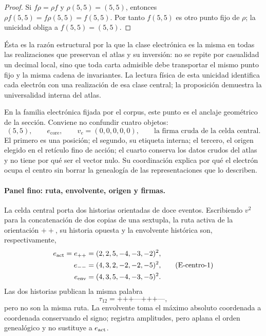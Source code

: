\begin{proof}
Si \(f\rho=\rho f\) y \(\rho(5,5)=(5,5)\), entonces
\(\rho f(5,5)=f\rho(5,5)=f(5,5)\). Por tanto \(f(5,5)\) es otro punto fijo
de \(\rho\); la unicidad obliga a \(f(5,5)=(5,5)\).
\end{proof}

Ésta es la razón estructural por la que la clase electrónica es la misma en
todas las realizaciones que preservan el atlas y su inversión: no se repite
por casualidad un decimal local, sino que toda carta admisible debe
transportar el mismo punto fijo y la misma cadena de invariantes. La lectura
física de esta unicidad identifica cada electrón con una realización de esa
clase central; la proposición demuestra la universalidad interna del atlas.

En la familia electrónica fijada por el corpus, este punto es el anclaje
geométrico de la sección. Conviene no confundir cuatro objetos:
\[
 (5,5),\qquad
 e_{\mathrm{core}},\qquad
 v_e=(0,0,0,0,0),\qquad
 \text{la firma cruda de la celda central}.
\]
El primero es una posición; el segundo, su etiqueta interna; el tercero,
el origen elegido en el retículo fino de acción; el cuarto conserva los
datos crudos del atlas y no tiene por qué ser el vector nulo. Su
coordinación explica por qué el electrón ocupa el centro sin borrar la
genealogía de las representaciones que lo describen.

\paragraph{Panel fino: ruta, envolvente, origen y firmas.}
La celda central porta dos historias orientadas de doce eventos. Escribiendo
\(v^2\) para la concatenación de dos copias de una sextupla, la ruta activa
de la orientación \({++}\), su historia opuesta y la envolvente histórica
son, respectivamente,
\[
\begin{aligned}
 e_{\rm act}=e_{++}
   &=(2,2,5,-4,-3,-2)^2,\\
 e_{--}
   &=(4,3,2,-2,-2,-5)^2,\\
 e_{\rm env}
   &=(4,3,5,-4,-3,-5)^2.
\end{aligned}
\tag{E-centro-1}\label{eq:electron-rutas-finas-rev8}
\]
Las dos historias publican la misma palabra
\[
 \tau_{12}=\texttt{+++---+++---},
\]
pero no son la misma ruta. La envolvente toma el máximo absoluto
coordenada a coordenada conservando el signo; registra amplitudes, pero
aplana el orden genealógico y no sustituye a \(e_{\rm act}\).


